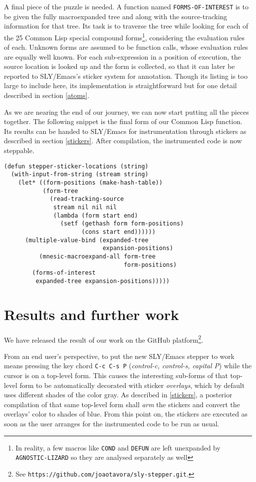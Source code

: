 \documentclass[format=sigconf]{acmart}
\begin{document}
A final piece of the puzzle is needed.  A function named
\texttt{FORMS-OF-INTEREST} is to be given the fully macroexpanded tree
and along with the source-tracking information for that tree.  Its
task is to traverse the tree while looking for each of the 25 Common
Lisp special compound forms\footnote{In reality, a few macros like
  \texttt{COND} and \texttt{DEFUN} are left unexpanded by
  \texttt{AGNOSTIC-LIZARD} so they are analysed separately as well},
considering the evaluation rules of each.  Unknown forms are assumed
to be function calls, whose evaluation rules are equally well known.
For each sub-expression in a position of execution, the source
location is looked up and the form is collected, so that it can later
be reported to SLY/Emacs's sticker system for annotation.  Though its
listing is too large to include here, its implementation is
straightforward but for one detail described in section \ref{atoms}.

As we are nearing the end of our journey, we can now start putting all
the pieces together. The following snippet is the final form of our
Common Lisp function. Its results can be handed to SLY/Emacs for
instrumentation through stickers as described in section
\ref{stickers}.  After compilation, the instrumented code is now
steppable.

\begin{verbatim}
(defun stepper-sticker-locations (string)
  (with-input-from-string (stream string)
    (let* ((form-positions (make-hash-table))
           (form-tree
             (read-tracking-source
              stream nil nil nil
              (lambda (form start end)
                (setf (gethash form form-positions)
                      (cons start end))))))
      (multiple-value-bind (expanded-tree
                            expansion-positions)
          (mnesic-macroexpand-all form-tree
                                  form-positions)
        (forms-of-interest
         expanded-tree expansion-positions)))))
\end{verbatim}

\section{Results and further work}\label{results}

We have released the result of our work on the GitHub
platform\footnote{See
  \texttt{https://github.com/joaotavora/sly-stepper.git}.}.

From an end user's perspective, to put the new SLY/Emacs stepper to
work means pressing the key chord \texttt{C-c C-s P} (\emph{control-c,
  control-s, capital P}) while the cursor is on a top-level form.
This causes the interesting sub-forms of that top-level form to be
automatically decorated with sticker \emph{overlays}, which by default
uses different shades of the color gray.  As described in
\ref{stickers}, a posterior compilation of that same top-level form
shall \emph{arm} the stickers and convert the overlays' color to
shades of blue.  From this point on, the stickers are executed as soon
as the user arranges for the instrumented code to be run as usual.
\end{document}
